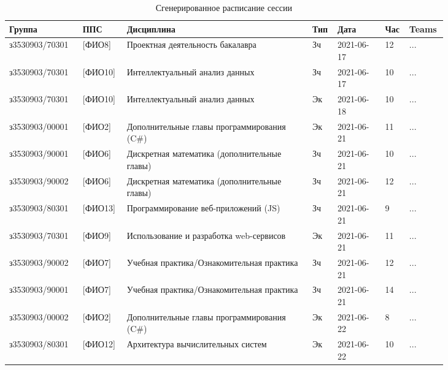 \begin{table}[htbp]
	\centering\small 
	\caption{Сгенерированное расписание сессии}%
	\begin{tabular}{|p{0.15\linewidth}|p{0.08\linewidth}|p{0.39\linewidth}|p{0.03\linewidth}|p{0.1\linewidth}|p{0.03\linewidth}|p{0.05\linewidth}|}
			\hline
			Группа         & ППС     & Дисциплина                                                    & Тип & Дата       & Час & Teams \\ \hline
			з3530903/70301 & {[}ФИО8{]}        & Проектная деятельность бакалавра                              & Зч  & 2021-06-17 & 12    & ...    \\ \hline
			з3530903/70301 & {[}ФИО10{]}       & Интеллектуальный анализ данных                                & Зч  & 2021-06-17 & 10    & ...    \\ \hline
			з3530903/70301 & {[}ФИО10{]}       & Интеллектуальный анализ данных                                & Эк  & 2021-06-18 & 10    & ...    \\ \hline
			з3530903/00001 & {[}ФИО2{]}        & Дополнительные главы программирования (C\#)                   & Эк  & 2021-06-21 & 11    & ...    \\ \hline
			з3530903/90001 & {[}ФИО6{]}        & Дискретная математика (дополнительные главы)                  & Зч  & 2021-06-21 & 10    & ...    \\ \hline
			з3530903/90002 & {[}ФИО6{]}        & Дискретная математика (дополнительные главы)                  & Зч  & 2021-06-21 & 12    & ...    \\ \hline
			з3530903/80301 & {[}ФИО13{]}       & Программирование веб-приложений (JS)                          & Зч  & 2021-06-21 & 9     & ...    \\ \hline
			з3530903/70301 & {[}ФИО9{]}        & Использование и разработка web-сервисов                       & Эк  & 2021-06-21 & 11    & ...    \\ \hline
			з3530903/90002 & {[}ФИО7{]}        & Учебная практика/Ознакомительная практика                     & Зч  & 2021-06-21 & 12    & ...    \\ \hline
			з3530903/90001 & {[}ФИО7{]}        & Учебная практика/Ознакомительная практика                     & Зч  & 2021-06-21 & 14    & ...    \\ \hline
			з3530903/00002 & {[}ФИО2{]}        & Дополнительные главы программирования (C\#)                   & Эк  & 2021-06-22 & 8     & ...    \\ \hline
			з3530903/80301 & {[}ФИО12{]}       & Архитектура вычислительных систем                             & Эк  & 2021-06-22 & 10    & ...    \\ \hline

\end{tabular}
\end{table}
